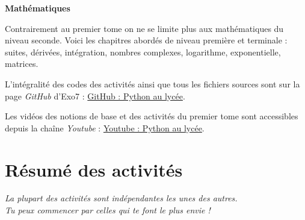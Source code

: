 \bigskip

{\large\textbf{Mathématiques}}

Contrairement au premier tome on ne se limite plus aux mathématiques du niveau seconde. Voici les chapitres abordés de niveau première et terminale : suites, dérivées, intégration, nombres complexes, logarithme, exponentielle, matrices. 




\bigskip
\vspace*{\fill}
\begin{center}
L'intégralité des codes \Python{} des activités ainsi que tous les fichiers sources sont sur la page \emph{GitHub} d'Exo7 :
\href{https://github.com/exo7math/python2-exo7}{\og{}GitHub : Python au lycée\fg{}}.

\medskip

Les vidéos des notions de base et des activités du premier tome sont accessibles depuis la chaîne \emph{Youtube} :
\href{https://www.youtube.com/channel/UC6PiFyqBiUjiJ7Q3DRSW2Wg}{\og{}Youtube : Python au lycée\fg{}}.
\end{center}





\cleardoublepage
\thispagestyle{empty}
\tableofcontents


\newpage

\section*{Résumé des activités}


\newcommand{\titreactivite}[1]{{\textbf{#1}}\nopagebreak}
\newcommand{\descriptionactivite}[1]{%
\vspace{0.5ex}\hfill
\begin{minipage}{0.95\textwidth}\small#1\end{minipage}\medskip}

\vspace*{-1.5ex}

\begin{center}
\begin{minipage}{0.8\textwidth}
\center\emph{
La plupart des activités sont indépendantes les unes des autres.\\
Tu peux commencer par celles qui te font le plus envie !
}	
\end{minipage}
\end{center}

